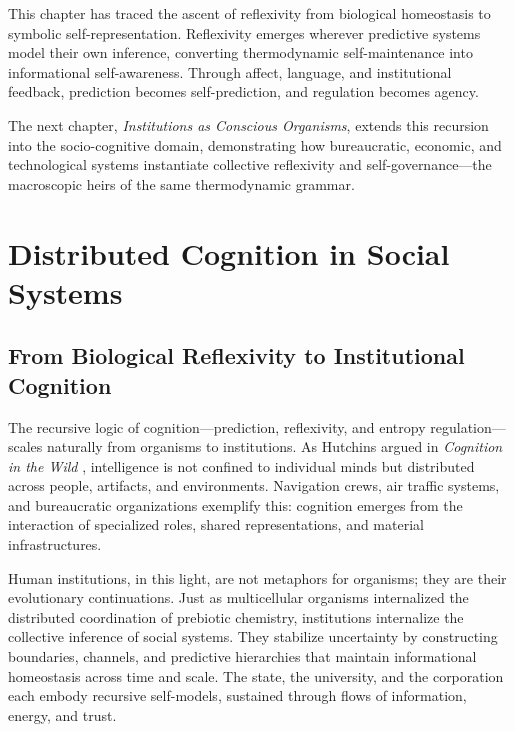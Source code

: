 \documentclass[11pt,a4paper]{article}
\begin{document}
This chapter has traced the ascent of reflexivity from biological homeostasis to symbolic self-representation.  Reflexivity emerges wherever predictive systems model their own inference, converting thermodynamic self-maintenance into informational self-awareness.  Through affect, language, and institutional feedback, prediction becomes self-prediction, and regulation becomes agency.  

The next chapter, \textit{Institutions as Conscious Organisms}, extends this recursion into the socio-cognitive domain, demonstrating how bureaucratic, economic, and technological systems instantiate collective reflexivity and self-governance—the macroscopic heirs of the same thermodynamic grammar.


\section{Distributed Cognition in Social Systems}
\label{sec:social-cognition}

\subsection{From Biological Reflexivity to Institutional Cognition}

The recursive logic of cognition—prediction, reflexivity, and entropy regulation—scales naturally from organisms to institutions.  As Hutchins argued in \emph{Cognition in the Wild} \citep{Hutchins1995CognitionInTheWild}, intelligence is not confined to individual minds but distributed across people, artifacts, and environments.  Navigation crews, air traffic systems, and bureaucratic organizations exemplify this: cognition emerges from the interaction of specialized roles, shared representations, and material infrastructures.  

Human institutions, in this light, are not metaphors for organisms; they are their evolutionary continuations.  Just as multicellular organisms internalized the distributed coordination of prebiotic chemistry, institutions internalize the collective inference of social systems.  They stabilize uncertainty by constructing boundaries, channels, and predictive hierarchies that maintain informational homeostasis across time and scale.  The state, the university, and the corporation each embody recursive self-models, sustained through flows of information, energy, and trust.
\end{document}
